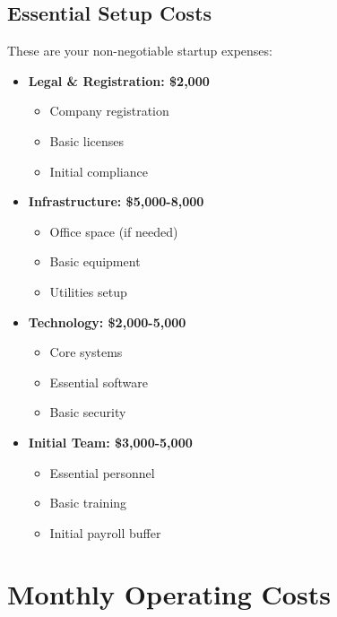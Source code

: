 \subsection{Essential Setup Costs}\label{subsec:essential-setup-costs}
These are your non-negotiable startup expenses:

\begin{tcolorbox}[colback=white,colframe=primarydark,title=\textbf{Core Setup Components}]
\begin{itemize}
    \item \textbf{Legal \& Registration: \$2,000}
    \begin{itemize}
        \item Company registration
        \item Basic licenses
        \item Initial compliance
    \end{itemize}

    \item \textbf{Infrastructure: \$5,000-8,000}
    \begin{itemize}
        \item Office space (if needed)
        \item Basic equipment
        \item Utilities setup
    \end{itemize}

    \item \textbf{Technology: \$2,000-5,000}
    \begin{itemize}
        \item Core systems
        \item Essential software
        \item Basic security
    \end{itemize}

    \item \textbf{Initial Team: \$3,000-5,000}
    \begin{itemize}
        \item Essential personnel
        \item Basic training
        \item Initial payroll buffer
    \end{itemize}
\end{itemize}
\end{tcolorbox}

\section{Monthly Operating Costs}\label{sec:monthly-operating-costs}

